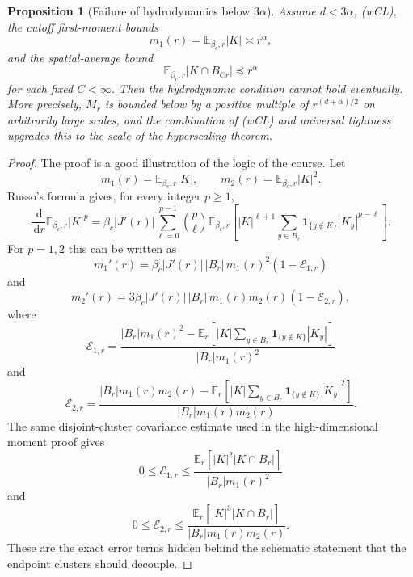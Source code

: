 \documentclass[11pt,reqno]{book}
\numberwithin{equation}{chapter}
\theoremstyle{plain}
\newtheorem{prop}[theorem]{Proposition}
\theoremstyle{definition}
\theoremstyle{remark}
\newcommand{\E}{\mathbb E}
\newcommand{\1}{\mathbf 1}
\newcommand{\dd}{\,\mathrm d}
\newcommand{\pre}{\preceq}
\begin{document}
\begin{prop}[Failure of hydrodynamics below \(3\alpha\)]
Assume \(d<3\alpha\), (wCL), the cutoff first-moment bounds
\[
  m_1(r)=\E_{\beta_c,r}|K|\asymp r^\alpha,
\]
and the spatial-average bound
\[
  \E_{\beta_c,r}|K\cap B_{Cr}|\pre r^\alpha
\]
for each fixed \(C<\infty\). Then the hydrodynamic condition cannot hold
eventually. More precisely, \(M_r\) is bounded below by a positive multiple
of \(r^{(d+\alpha)/2}\) on arbitrarily large scales, and the combination of
(wCL) and universal tightness upgrades this to the scale of the hyperscaling
theorem.
\end{prop}

\begin{proof}
The proof is a good illustration of the logic of the course. Let
\[
  m_1(r)=\E_{\beta_c,r}|K|,
  \qquad
  m_2(r)=\E_{\beta_c,r}|K|^2 .
\]
Russo's formula gives, for every integer \(p\geq1\),
\[
  \frac{\dd}{\dd r}\E_{\beta_c,r}|K|^p
  =
  \beta_c |J'(r)|
  \sum_{\ell=0}^{p-1}\binom p\ell
  \E_{\beta_c,r}\!\left[
    |K|^{\ell+1}
    \sum_{y\in B_r}
    \1_{\{y\notin K\}}|K_y|^{p-\ell}
  \right].
\]
For \(p=1,2\) this can be written as
\[
  m_1'(r)
  =
  \beta_c |J'(r)|\,|B_r|\,m_1(r)^2(1-\mathcal E_{1,r})
\]
and
\[
  m_2'(r)
  =
  3\beta_c |J'(r)|\,|B_r|\,m_1(r)m_2(r)(1-\mathcal E_{2,r}),
\]
where
\[
  \mathcal E_{1,r}
  =
  \frac{|B_r|m_1(r)^2-
  \E_r\!\left[
    |K|\sum_{y\in B_r}\1_{\{y\notin K\}}|K_y|
  \right]}
  {|B_r|m_1(r)^2}
\]
and
\[
  \mathcal E_{2,r}
  =
  \frac{|B_r|m_1(r)m_2(r)-
  \E_r\!\left[
    |K|\sum_{y\in B_r}\1_{\{y\notin K\}}|K_y|^2
  \right]}
  {|B_r|m_1(r)m_2(r)}.
\]
The same disjoint-cluster covariance estimate used in the high-dimensional
moment proof gives
\[
  0\leq \mathcal E_{1,r}
  \leq
  \frac{\E_r[|K|^2|K\cap B_r|]}
       {|B_r|m_1(r)^2}
\]
and
\[
  0\leq \mathcal E_{2,r}
  \leq
  \frac{\E_r[|K|^3|K\cap B_r|]}
       {|B_r|m_1(r)m_2(r)}.
\]
These are the exact error terms hidden behind the schematic statement that
the endpoint clusters should decouple.


\end{proof}
\end{document}
